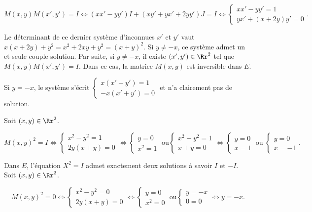 {\begin{enumerate}
{$$M(x,y)M(x',y')=I\Leftrightarrow(xx'-yy')I+(xy'+yx'+2yy')J=I\Leftrightarrow
\left\{
\begin{array}{l}
xx'-yy'=1\\
yx'+(x+2y)y'=0
\end{array}
\right..$$

Le déterminant de ce dernier système d'inconnues $x'$ et $y'$ vaut $x(x+2y)+y^2=x^2+2xy+y^2=(x+y)^2$. Si $y\neq-x$, ce système admet un et seule couple solution. Par suite, si $y\neq -x$, il existe $(x',y')\in\Rr^2$ tel que $M(x,y)M(x',y')=I$. Dans ce cas, la matrice $M(x,y)$ est inversible dans $E$.

Si $y=-x$, le système s'écrit $\left\{
\begin{array}{l}
x(x'+y')=1\\
-x(x'+y')=0
\end{array}
\right.$ et n'a clairement pas de solution.
\begin{enumerate}
Soit $(x,y)\in\Rr^2$.

$$M(x,y)^2=I\Leftrightarrow\left\{
\begin{array}{l}
x^2-y^2=1\\
2y(x+y)=0
\end{array}
\right.\Leftrightarrow\left\{
\begin{array}{l}
y=0\\
x^2=1
\end{array}
\right.
\;\mbox{ou}
\left\{
\begin{array}{l}
x^2-y^2=1\\
x+y=0
\end{array}
\right.
\Leftrightarrow\left\{
\begin{array}{l}
y=0\\
x=1
\end{array}
\right.
\;\mbox{ou}\;\left\{
\begin{array}{l}
y=0\\
x=-1
\end{array}
\right..$$

Dans $E$, l'équation $X^2=I$ admet exactement deux solutions à savoir $I$ et $-I$.
Soit $(x,y)\in\Rr^2$.

$$M(x,y)^2=0\Leftrightarrow\left\{
\begin{array}{l}
x^2-y^2=0\\
2y(x+y)=0
\end{array}
\right.\Leftrightarrow\left\{
\begin{array}{l}
y=0\\
x^2=0
\end{array}
\right.
\;\mbox{ou}
\left\{
\begin{array}{l}
y=-x\\
0=0
\end{array}
\right.
\Leftrightarrow y=-x.$$


\end{enumerate}}
\end{enumerate}}
